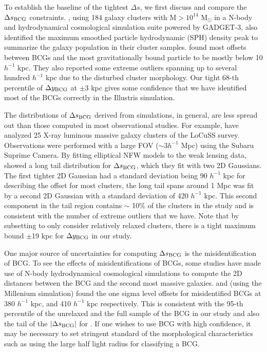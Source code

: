 To establish the baseline of the tightest $\Delta s$, we first discuss and 
compare the $\Delta s_{\rm BCG}$ constraints.   
\cite{Cui2015}, using 184 galaxy clusters with M$ > 10^{14}$ M$_\odot$ in a
N-body and hydrodynamical cosmological simulation suite powered by GADGET-3, 
also identified the maximum smoothed particle hydrodynamic (SPH) density peak
to summarize 
the galaxy population in their cluster samples. \cite{Cui2015} found
most offsets between BCGs and the most gravitationally bound particle to be
mostly below 10 $h^{-1}$ kpc. They also reported some extreme outliers 
spanning up to several hundred $h^{-1}$ kpc due to the disturbed cluster morphology. Our 
tight 68-th percentile of 
$\Delta y_{\rm BCG}$ at $ \pm 3$ kpc gives some confidence that 
we have identified most of the BCGs correctly in the Illustris simulation.

The distributions of $\Delta s_{\rm BCG}$ derived from simulations, in general, 
are less spread out than those computed in most observational studies.
For example, \cite{Oguri2010} have analyzed 25 X-ray luminous 
massive galaxy clusters of the LoCuSS survey. 
Observations were performed with a large FOV ($\sim 3 h^{-1}$ Mpc) 
using the Subaru Suprime Camera. 
By fitting elliptical NFW models to the weak lensing data, \cite{Oguri2010}
showed a long tail
 distribution for $\Delta s_{\rm BCG}$, which they fit with two 2D Gaussians.
The first tighter 2D Gaussian had a standard deviation being 90
$h^{-1}$ kpc for describing the
offset for most clusters, the long tail spans around 1 Mpc was fit by a second 2D
Gaussian with a standard deviation of 420 $h^{-1}$ kpc. This second component
in the tail region contains $\sim$ 10\% of the clusters in the study and is
consistent with the number of extreme outliers that we have.   
Note that by subsetting to only consider relatively relaxed clusters, 
there is a tight maximum bound $\pm$19 kpc for $\Delta y_{\rm BCG}$ in our study. 

One major source of uncertainties for computing $\Delta s_{\rm BCG}$ is the
misidentification of BCG.
To see the effects of misidentifications of 
BCGs, some studies have made use of N-body hydrodynamical cosmological
simulations to compute the 2D distances between the BCG and 
the second most massive galaxies. \cite{Johnston2007b} and 
\cite{Hilbert2010} (using the Millenium simulation)  found 
the one sigma level offsets for misidentified BCGs at 380 $h^{-1}$ kpc, and 410 
$h^{-1}$ kpc respectively. This is consistent with the 95-th percentile of the
unrelaxed and the full sample of the BCG in our study and also the tail of the
$|\Delta s_{\rm BCG}|$ for \cite{Cui2015}. If one wishes to use BCG with high
confidence, it may be necessary to set stringent standard of the morphological
characteristics such as using the large half light radius for classifying a BCG.

